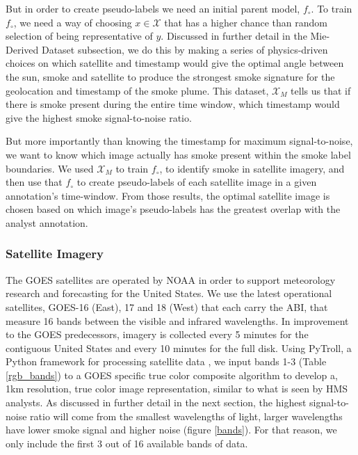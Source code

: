 But in order to create pseudo-labels we need an initial parent model, \(f_{\circ}\). To train \(f_{\circ}\), we need a way of choosing \(x \in \mathcal{X}\) that has a higher chance than random selection of being representative of \(y\). Discussed in further detail in the Mie-Derived Dataset subsection, we do this by making a series of physics-driven choices on which satellite and timestamp would give the optimal angle between the sun, smoke and satellite to produce the strongest smoke signature for the geolocation and timestamp of the smoke plume. This dataset, \(\mathcal{X}_M\) tells us that if there is smoke present during the entire time window, which timestamp would give the highest smoke signal-to-noise ratio. 

But more importantly than knowing the timestamp for maximum signal-to-noise, we want to know which image actually has smoke present within the smoke label boundaries. We used \(\mathcal{X}_M\) to train \(f_{\circ}\), to identify smoke in satellite imagery, and then use that \(f_{\circ}\) to create pseudo-labels of each satellite image in a given annotation's time-window. From those results, the optimal satellite image is chosen based on which image's pseudo-labels has the greatest overlap with the analyst annotation.




\subsubsection{Satellite Imagery} 

The GOES satellites are operated by NOAA in order to support meteorology research and forecasting for the United States. We use the latest operational satellites, GOES-16 (East), 17 and 18 (West) that each carry the ABI, that measure 16 bands between the visible and infrared wavelengths. In improvement to the GOES predecessors, imagery is collected every 5 minutes for the contiguous United States and every 10 minutes for the full disk. Using PyTroll, a Python framework for processing satellite data \cite{satpy}, we input bands 1-3 (Table \ref{rgb_bands}) to a GOES specific true color composite algorithm \cite{true_color} to develop a, 1km resolution, true color image representation, similar to what is seen by HMS analysts. As discussed in further detail in the next section, the highest signal-to-noise ratio will come from the smallest wavelengths of light, larger wavelengths have lower smoke signal and higher noise (figure \ref{bands}). For that reason, we only include the first 3 out of 16 available bands of data.

